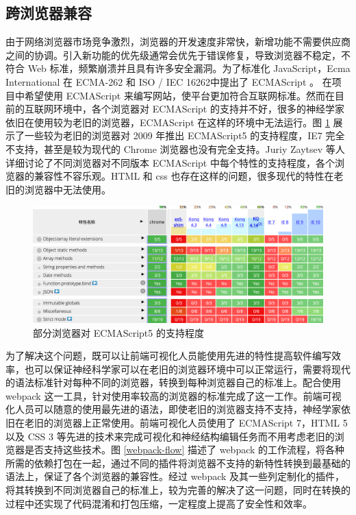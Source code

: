 \subsection{跨浏览器兼容}
由于网络浏览器市场竞争激烈，浏览器的开发速度非常快，新增功能不需要供应商之间的协调。引入新功能的优先级通常会优先于错误修复，导致浏览器不稳定，不符合 Web 标准，频繁崩溃并且具有许多安全漏洞。为了标准化 JavaScript，Ecma International 在 ECMA-262 和 ISO / IEC 16262中提出了 ECMAScript 。 在项目中希望使用 ECMAScript 来编写网站，使平台更加符合互联网标准。然而在目前的互联网环境中，各个浏览器对 ECMAScript 的支持并不好，很多的神经学家依旧在使用较为老旧的浏览器，ECMAScript 在这样的环境中无法运行。图 \ref{es5} 展示了一些较为老旧的浏览器对 2009 年推出 ECMAScript5 的支持程度，IE7 完全不支持，甚至是较为现代的 Chrome 浏览器也没有完全支持。Juriy Zaytsev 等人详细讨论了不同浏览器对不同版本 ECMAScript 中每个特性的支持程度，各个浏览器的兼容性不容乐观。HTML 和 css 也存在这样的问题，很多现代的特性在老旧的浏览器中无法使用。

\begin{figure}[!ht]
\centering
\includegraphics[width=148mm]{images/es5}
\caption{部分浏览器对 ECMAScript5 的支持程度}
\label{es5}
\end{figure}

为了解决这个问题，既可以让前端可视化人员能使用先进的特性提高软件编写效率，也可以保证神经科学家可以在老旧的浏览器环境中可以正常运行，需要将现代的语法标准针对每种不同的浏览器，转换到每种浏览器自己的标准上。配合使用 webpack 这一工具，针对使用率较高的浏览器的标准完成了这一工作。前端可视化人员可以随意的使用最先进的语法，即使老旧的浏览器支持不支持，神经学家依旧在老旧的浏览器上正常使用。前端可视化人员使用了 ECMAScript 7，HTML 5 以及 CSS 3 等先进的技术来完成可视化和神经结构编辑任务而不用考虑老旧的浏览器是否支持这些技术。图 \ref{webpack-flow} 描述了 webpack 的工作流程，将各种所需的依赖打包在一起，通过不同的插件将浏览器不支持的新特性转换到最基础的语法上，保证了各个浏览器的兼容性。经过 webpack 及其一些列定制化的插件，将其转换到不同浏览器自己的标准上，较为完善的解决了这一问题，同时在转换的过程中还实现了代码混淆和打包压缩，一定程度上提高了安全性和效率。

